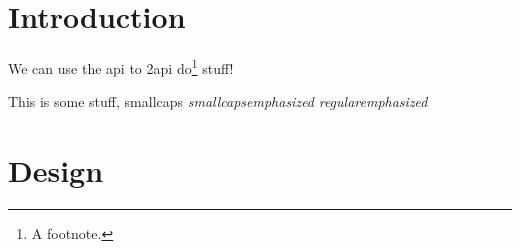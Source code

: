 \documentclass{../../uit-thesis}
\begin{document}
\frontmatter

\tableofcontents


\printglossaries
{}

\mainmatter

\chapter{Introduction}
\lipsum[1-4]

We can use the \ac{api} to \ac{2api} do\footnote{A footnote.} stuff!

This is some stuff, {\sc smallcaps {\em smallcapsemphasized}} {\em
regularemphasized}

\chapter{Design}
\lipsum[5-8]
\end{document}
